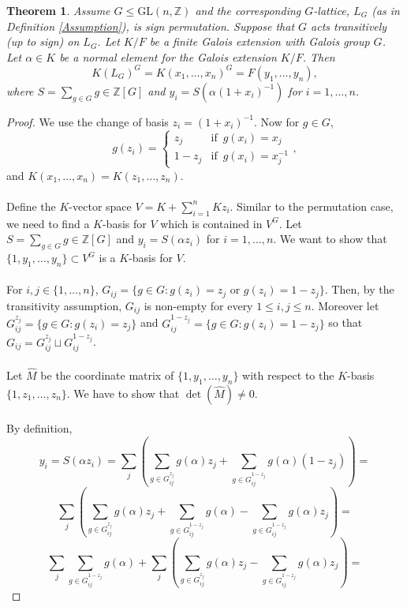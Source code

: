 \documentclass{article}
\theoremstyle{plain}
\newtheorem{theorem}{Theorem}
\theoremstyle{definition}
\newcommand{\Z}{\ensuremath{\mathbb{Z}}}
\begin{document}
\begin{theorem}\label{nonamesign}
Assume $G \leq \mathrm{GL}(n,\Z)$ and the corresponding $G$-lattice, $L_G$ (as in Definition \ref{Assumption}), is sign permutation. Suppose that $G$ acts transitively (up to sign) on $L_G$. Let $K/F$ be a finite Galois extension with Galois group $G$. Let $\alpha \in K$ be a normal element for the Galois extension $K/F$. Then 
$$K(L_G)^G = K(x_1,\ldots, x_n)^G = F(y_1, \ldots, y_{n}),$$ 
where $S = \sum_{g \in G} g \in \Z[G]$ and $y_i = S(\alpha (1+x_i)^{-1})$ for $ i = 1, \ldots, n$.
\end{theorem}
\begin{proof}
We use the change of basis $z_i = (1+x_i)^{-1} $. Now for $g \in G$, $$g(z_i) = \begin{cases} z_j  & \text{if} \,\,\, g(x_i) = x_j \\
1-z_j & \text{if} \,\,\, g(x_i) = x_j^{-1}
\end{cases},$$ 
 and $K(x_1, \ldots , x_n) = K(z_1, \ldots, z_n).$\\
 \\
Define the $K$-vector space $V= K + \sum^n_{i=1}Kz_i$. Similar to the permutation case, we need to find a $K$-basis for $V$ which is contained in $V^G$. Let $S = \sum_{g \in G} g \in \Z[G]$ and $y_i = S(\alpha z_i)$ for $ i = 1, \ldots, n$. We want to show that $\lbrace 1, y_1, \ldots	, y_n \rbrace \subset V^G$ is a $K$-basis for $V$.\\
\\
For $i,j \in \lbrace 1, \ldots , n \rbrace$, $G_{ij} = \lbrace g \in G : g(z_i) = z_j \,\, \text{or} \,\, g(z_i) = 1-z_j \rbrace $. Then, by the transitivity assumption, $G_{ij}$ is non-empty for every $1 \leq i,j \leq n$. Moreover let $G^{z_j}_{ij} = \lbrace g \in G : g(z_i) = z_j \rbrace$ and $G^{1-z_j}_{ij} = \lbrace g \in G : g(z_i) = 1- z_j \rbrace$ so that $G_{ij}= G^{z_j}_{ij}\sqcup G^{1-z_j}_{ij}$.
\\
\\
Let $\hat{M}$ be the coordinate matrix of $\lbrace 1, y_1, \ldots	, y_n \rbrace$ with respect to the $K$-basis $\lbrace 1, z_1, \ldots , z_n \rbrace$. We have to show that  $\det (\hat{M}) \neq 0$. \\
\\
By definition, 
$$y_i = S(\alpha z_i) = \sum_{j}(\sum_{g\in G^{z_j}_{ij}}g(\alpha)z_j +\sum_{g\in G^{1-z_j}_{ij}}g(\alpha)(1-z_j)) =$$ 
$$ \sum_{j}(\sum_{g\in G^{z_j}_{ij}}g(\alpha)z_j +\sum_{g\in G^{1-z_j}_{ij}}g(\alpha)-\sum_{g\in G^{1-z_j}_{ij}}g(\alpha)z_j) = $$ 
$$\sum_{j}\sum_{g\in G^{1-z_j}_{ij}}g(\alpha)+ \sum_{j}(\sum_{g\in G^{z_j}_{ij}}g(\alpha)z_j -\sum_{g\in G^{1-z_j}_{ij}}g(\alpha)z_j) =$$

\end{proof}
\end{document}
